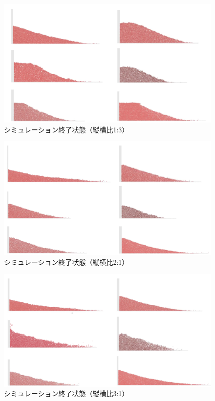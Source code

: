 \documentclass[12pt]{ltjsarticle}
\begin{document}
\clearpage

\begin{figure}[htbp]
      \centering
      \includegraphics*[keepaspectratio, scale=0.35]{1_2_nagasu.PNG}
      \caption{シミュレーション終了状態（縦横比1:3）}
\end{figure}

\begin{figure}[htbp]
      \centering
      \includegraphics*[keepaspectratio, scale=0.35]{2_1_nagasu.PNG}
      \caption{シミュレーション終了状態（縦横比2:1）}
\end{figure}

\clearpage

\begin{figure}[htbp]
      \centering
      \includegraphics*[keepaspectratio, scale=0.35]{3_1_nagasu.PNG}
      \caption{シミュレーション終了状態（縦横比3:1）}
\end{figure}
\end{document}
